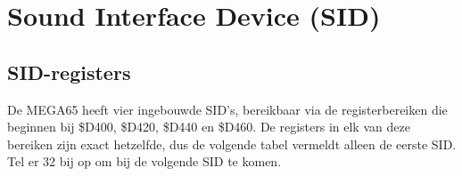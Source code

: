 \chapter{Sound Interface Device (SID)}

\section{SID-registers}

De MEGA65 heeft vier ingebouwde SID's, bereikbaar via de registerbereiken die beginnen bij \$D400, \$D420, \$D440 en \$D460. De registers in elk van deze bereiken zijn exact hetzelfde, dus de volgende tabel vermeldt alleen de eerste SID. Tel er 32 bij op om bij de volgende SID te komen.


